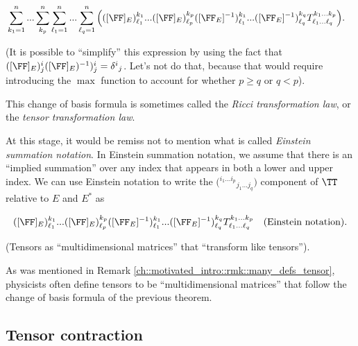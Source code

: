 \begin{theorem}
    \begin{align*}
        &\sum_{k_1 = 1}^n ... \sum_{k_p}^n \sum_{\ell_1 = 1}^n ... \sum_{\ell_q = 1}^n \Big( ([\FF]_E)^{k_1}_{\ell_1} ... ([\FF]_E)^{k_p}_{\ell_p}
        ([\FF_E]^{-1})^{k_1}_{\ell_1} ... ([\FF_E]^{-1})^{k_q}_{\ell_q} 
        T^{k_1 ... k_p}_{\ell_1 ... \ell_q}\Big).
    \end{align*}
    
    (It is possible to ``simplify'' this expression by using the fact that $([\FF]_E)^i_j ([\FF]_E)^{-1})^i_j = \delta^i{}_j$. Let's not do that, because that would require introducing the $\max$ function to account for whether $p \geq q$ or $q < p$).
    
    This change of basis formula is sometimes called the \textit{Ricci transformation law}, or the \textit{tensor transformation law}.
    
    At this stage, it would be remiss not to mention what is called \textit{Einstein summation notation}. In Einstein summation notation, we assume that there is an ``implied summation'' over any index that appears in both a lower and upper index. We can use Einstein notation to write the $\Big( {}^{i_1 ... i_p}{}_{j_1 ... j_q} \Big)$ component of $\TT$ relative to $E$ and $E^*$ as
    
    \begin{align*}
        ([\FF]_E)^{k_1}_{\ell_1} ... ([\FF]_E)^{k_p}_{\ell_p}
        ([\FF_E]^{-1})^{k_1}_{\ell_1} ... ([\FF_E]^{-1})^{k_q}_{\ell_q} 
        T^{k_1 ... k_p}_{\ell_1 ... \ell_q} \quad \text{(Einstein notation)}.
    \end{align*}
\end{theorem}

\begin{remark}
    (Tensors as ``multidimensional matrices'' that ``transform like tensors''). 
    
    As was mentioned in Remark \ref{ch::motivated_intro::rmk::many_defs_tensor}, physicists often define tensors to be ``multidimensional matrices'' that follow the change of basis formula of the previous theorem.
\end{remark}

\subsection*{Tensor contraction}

